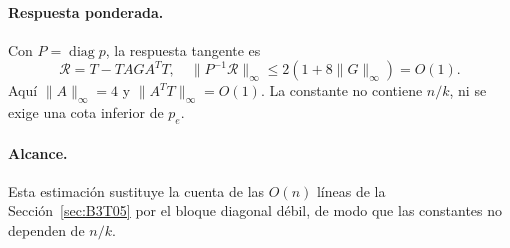 \paragraph{Respuesta ponderada.}
Con $P=\operatorname{diag}p$, la respuesta tangente es
\[
 \mathcal R=T-TAG A^TT,
 \quad\|P^{-1}\mathcal R\|_\infty
 \le2(1+8\|G\|_\infty)=O(1).
\]
Aquí $\|A\|_\infty=4$ y $\|A^TT\|_\infty=O(1)$.
La constante no contiene $n/k$, ni se exige una cota inferior de $p_e$.

\paragraph{Alcance.}
Esta estimación sustituye la cuenta de las $O(n)$ líneas de la Sección~\ref{sec:B3T05} por el bloque
diagonal débil, de modo que las constantes no dependen de $n/k$.
